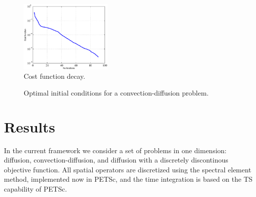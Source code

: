 \documentclass[10pt]{article}
\begin{document}
\begin{figure}[!ht]
\centering
\includegraphics[width=0.4\textwidth]{Cost_decay.eps}
\caption{Cost function decay.}
\label{fig:decay_cd}
\end{figure}

\begin{figure}[!h]
\centering
{}
\quad
{}
\caption{Optimal initial conditions for a convection-diffusion problem.}
\end{figure}
\section{Results}

In the current framework we consider a set of problems in one dimension: diffusion, convection-diffusion, and diffusion with a discretely discontinous objective function. All spatial operators are discretized using the spectral element method, implemented now in PETSc, and the time integration is based on the TS capability of PETSc.
\end{document}
